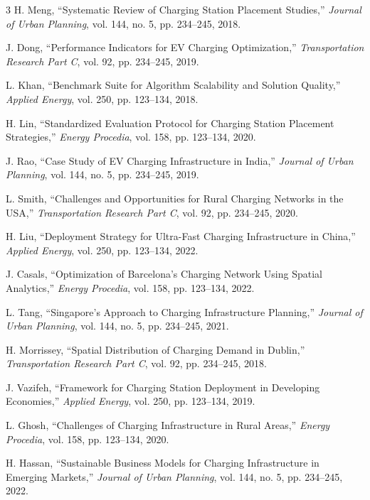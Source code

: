 \documentclass[journal]{IEEEtran}
\begin{document}
\begin{thebibliography}{3}
H. Meng, ``Systematic Review of Charging Station Placement Studies,'' \emph{Journal of Urban Planning}, vol. 144, no. 5, pp. 234--245, 2018.

J. Dong, ``Performance Indicators for EV Charging Optimization,'' \emph{Transportation Research Part C}, vol. 92, pp. 234--245, 2019.

L. Khan, ``Benchmark Suite for Algorithm Scalability and Solution Quality,'' \emph{Applied Energy}, vol. 250, pp. 123--134, 2018.

H. Lin, ``Standardized Evaluation Protocol for Charging Station Placement Strategies,'' \emph{Energy Procedia}, vol. 158, pp. 123--134, 2020.

J. Rao, ``Case Study of EV Charging Infrastructure in India,'' \emph{Journal of Urban Planning}, vol. 144, no. 5, pp. 234--245, 2019.

L. Smith, ``Challenges and Opportunities for Rural Charging Networks in the USA,'' \emph{Transportation Research Part C}, vol. 92, pp. 234--245, 2020.

H. Liu, ``Deployment Strategy for Ultra-Fast Charging Infrastructure in China,'' \emph{Applied Energy}, vol. 250, pp. 123--134, 2022.

J. Casals, ``Optimization of Barcelona's Charging Network Using Spatial Analytics,'' \emph{Energy Procedia}, vol. 158, pp. 123--134, 2022.

L. Tang, ``Singapore's Approach to Charging Infrastructure Planning,'' \emph{Journal of Urban Planning}, vol. 144, no. 5, pp. 234--245, 2021.

H. Morrissey, ``Spatial Distribution of Charging Demand in Dublin,'' \emph{Transportation Research Part C}, vol. 92, pp. 234--245, 2018.

J. Vazifeh, ``Framework for Charging Station Deployment in Developing Economies,'' \emph{Applied Energy}, vol. 250, pp. 123--134, 2019.

L. Ghosh, ``Challenges of Charging Infrastructure in Rural Areas,'' \emph{Energy Procedia}, vol. 158, pp. 123--134, 2020.

H. Hassan, ``Sustainable Business Models for Charging Infrastructure in Emerging Markets,'' \emph{Journal of Urban Planning}, vol. 144, no. 5, pp. 234--245, 2022.
\end{thebibliography}
\end{document}
